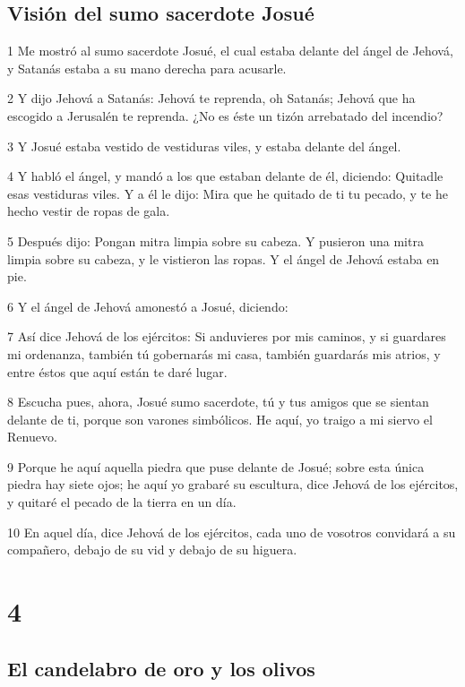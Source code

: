 \section*{Visión del sumo sacerdote Josué}

\par 1 Me mostró al sumo sacerdote Josué, el cual estaba delante del ángel de Jehová, y Satanás estaba a su mano derecha para acusarle. 
\par 2 Y dijo Jehová a Satanás: Jehová te reprenda, oh Satanás; Jehová que ha escogido a Jerusalén te reprenda. ¿No es éste un tizón arrebatado del incendio?
\par 3 Y Josué estaba vestido de vestiduras viles, y estaba delante del ángel.
\par 4 Y habló el ángel, y mandó a los que estaban delante de él, diciendo: Quitadle esas vestiduras viles. Y a él le dijo: Mira que he quitado de ti tu pecado, y te he hecho vestir de ropas de gala.
\par 5 Después dijo: Pongan mitra limpia sobre su cabeza. Y pusieron una mitra limpia sobre su cabeza, y le vistieron las ropas. Y el ángel de Jehová estaba en pie.
\par 6 Y el ángel de Jehová amonestó a Josué, diciendo:
\par 7 Así dice Jehová de los ejércitos: Si anduvieres por mis caminos, y si guardares mi ordenanza, también tú gobernarás mi casa, también guardarás mis atrios, y entre éstos que aquí están te daré lugar.
\par 8 Escucha pues, ahora, Josué sumo sacerdote, tú y tus amigos que se sientan delante de ti, porque son varones simbólicos. He aquí, yo traigo a mi siervo el Renuevo. 
\par 9 Porque he aquí aquella piedra que puse delante de Josué; sobre esta única piedra hay siete ojos; he aquí yo grabaré su escultura, dice Jehová de los ejércitos, y quitaré el pecado de la tierra en un día.
\par 10 En aquel día, dice Jehová de los ejércitos, cada uno de vosotros convidará a su compañero, debajo de su vid y debajo de su higuera. 

\chapter{4}

\section*{El candelabro de oro y los olivos}

